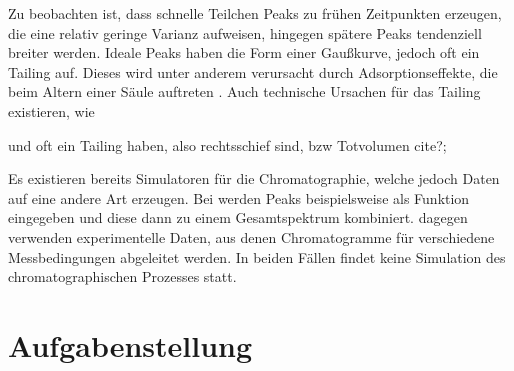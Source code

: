 \documentclass[a4paper,10pt]{article}
\begin{document}


Zu beobachten ist, dass schnelle Teilchen Peaks zu frühen Zeitpunkten erzeugen, die eine relativ geringe Varianz aufweisen, hingegen spätere Peaks tendenziell breiter werden. Ideale Peaks haben die Form einer Gaußkurve, jedoch oft ein Tailing auf. Dieses wird unter anderem verursacht durch Adsorptionseffekte, die beim Altern einer Säule auftreten \cite{kolb2003}. Auch technische Ursachen für das Tailing existieren, wie  

 und oft ein Tailing haben, also rechtsschief sind, bzw Totvolumen cite?;

Es existieren bereits Simulatoren für die Chromatographie, welche jedoch Daten auf eine andere Art erzeugen. Bei \cite{spreadsheet} werden Peaks beispielsweise als Funktion eingegeben und diese dann zu einem Gesamtspektrum kombiniert. \cite{hplcsim} dagegen verwenden experimentelle Daten, aus denen Chromatogramme für verschiedene Messbedingungen abgeleitet werden. In beiden Fällen findet keine Simulation des chromatographischen Prozesses statt.


\section{Aufgabenstellung}
\end{document}
